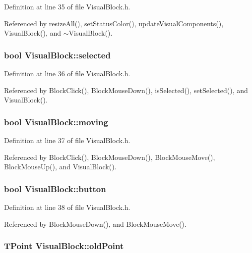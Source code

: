 Definition at line 35 of file VisualBlock.h.

Referenced by resizeAll(), setStatusColor(), updateVisualComponents(), VisualBlock(), and $\sim$VisualBlock().\hypertarget{classVisualBlock_6d94e21639a7e021c92a0fd31e859487}{
\subsubsection[selected]{\setlength{\rightskip}{0pt plus 5cm}bool {\bf VisualBlock::selected}}}
\label{classVisualBlock_6d94e21639a7e021c92a0fd31e859487}




Definition at line 36 of file VisualBlock.h.

Referenced by BlockClick(), BlockMouseDown(), isSelected(), setSelected(), and VisualBlock().\hypertarget{classVisualBlock_e8a5a106bf510e7029c0f453e6ecd999}{
\subsubsection[moving]{\setlength{\rightskip}{0pt plus 5cm}bool {\bf VisualBlock::moving}}}
\label{classVisualBlock_e8a5a106bf510e7029c0f453e6ecd999}




Definition at line 37 of file VisualBlock.h.

Referenced by BlockClick(), BlockMouseDown(), BlockMouseMove(), BlockMouseUp(), and VisualBlock().\hypertarget{classVisualBlock_b3035554398e30e608325b6c640ace2d}{
\subsubsection[button]{\setlength{\rightskip}{0pt plus 5cm}bool {\bf VisualBlock::button}}}
\label{classVisualBlock_b3035554398e30e608325b6c640ace2d}




Definition at line 38 of file VisualBlock.h.

Referenced by BlockMouseDown(), and BlockMouseMove().\hypertarget{classVisualBlock_43953361a9b50884f92ed3e9ee90c5b2}{
\subsubsection[oldPoint]{\setlength{\rightskip}{0pt plus 5cm}TPoint {\bf VisualBlock::oldPoint}}}
\label{classVisualBlock_43953361a9b50884f92ed3e9ee90c5b2}




